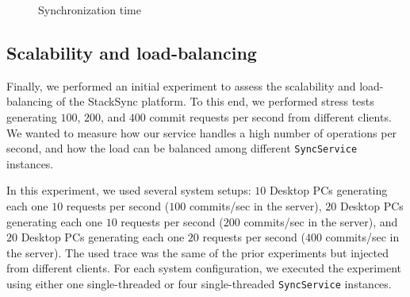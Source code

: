 \begin{figure}[t]
  \centering
	\caption{Synchronization time}
  \vspace{-5pt}
  \label{fig:synchronization_time}
\end{figure}


\subsection{Scalability and load-balancing}

Finally, we performed an initial experiment to assess the scalability and load-balancing of 
the StackSync platform. To this end, we performed stress tests generating $100$, $200$, and
$400$ commit requests per second from different clients. We wanted to measure how our service
handles a high number of operations per second, and how the load can be balanced among different
\texttt{SyncService} instances.

In this experiment, we used several system setups: $10$ Desktop PCs generating each one $10$ 
requests per second ($100$ commits/sec in the server), $20$ Desktop PCs generating each one
$10$ requests per second ($200$ commits/sec in the server), and $20$ Desktop PCs generating
each one $20$ requests per second ($400$ commits/sec in the server). 
The used trace was the same of the prior experiments but injected from different clients.
For each system configuration, we executed the experiment using either one single-threaded or four single-threaded 
\texttt{SyncService} instances. 

